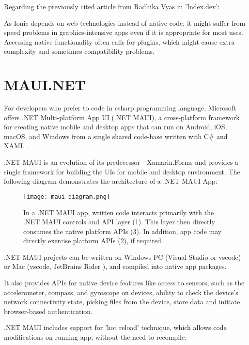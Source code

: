 Regarding the previously cited article from Radhika Vyas in 'Index.dev':
\begin{displayquote}
    As Ionic depends on web technologies instead of native code, it might suffer from speed problems in graphics-intensive apps even if it is appropriate for most uses. Accessing native functionality often calls for plugins, which might cause extra complexity and sometimes compatibility problems\textcite{Vyas}.
\end{displayquote}



\section{{MAUI.NET}}%
\label{sec:maui}

For developers who prefer to code in csharp programming language, Microsoft offers .NET Multi-platform App UI (.NET MAUI), a cross-platform framework for creating native mobile and desktop apps that can run on Android, iOS, macOS, and Windows from a single shared code-base written with C\# and XAML  \autocite{XAML} \autocite{MAUIDocs}. 

.NET MAUI is an evolution of its predecessor - Xamarin.Forms \autocite{Xamarin} and provides a single framework for building the UIs for mobile and desktop environment. The following diagram demonstrates the architecture of a .NET MAUI App:

\begin{figure}[H]
    \centering
    \texttt{[image: maui-diagram.png]}
    \caption[Layout]{\label{fig:maui} In a .NET MAUI app, written code interacts primarily  with the .NET MAUI controls and API layer (1). This layer then directly consumes the native platform APIs (3). In addition, app code may directly exercise platform APIs (2), if required. \autocite{MAUIDocs}}
\end{figure}

.NET MAUI projects can be written on Windows PC (Visual Studio or vscode) or Mac (vscode, JetBrains Rider \autocite{JBrainsRider}), and compiled into native app packages.

It also  provides APIs for native device features like access to sensors, such as the accelerometer, compass, and gyroscope on devices, ability to check the device's network connectivity state, picking files from the device, store data and initiate browser-based authentication.

.NET MAUI includes support for 'hot reload' technique, which allows code modifications on running app, without the need to recompile. 




